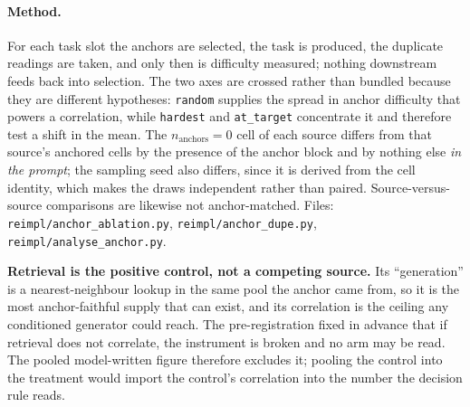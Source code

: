 \paragraph{Method.} For each task slot the anchors are selected, the task is produced, the
duplicate readings are taken, and only then is difficulty measured; nothing downstream feeds
back into selection. The two axes are crossed rather than bundled because they are different
hypotheses: \texttt{random} supplies the spread in anchor difficulty that powers a correlation,
while \texttt{hardest} and \texttt{at\_target} concentrate it and therefore test a shift in the
mean. The $n_{\text{anchors}}=0$ cell of each source differs from that source's anchored cells
by the presence of the anchor block and by nothing else \emph{in the prompt}; the sampling seed
also differs, since it is derived from the cell identity, which makes the draws independent
rather than paired. Source-versus-source comparisons are likewise not anchor-matched. Files:
\texttt{reimpl/anchor\_ablation.py}, \texttt{reimpl/anchor\_dupe.py},
\texttt{reimpl/analyse\_anchor.py}.

\textbf{Retrieval is the positive control, not a competing source.} Its ``generation'' is a
nearest-neighbour lookup in the same pool the anchor came from, so it is the most
anchor-faithful supply that can exist, and its correlation is the ceiling any conditioned
generator could reach. The pre-registration fixed in advance that if retrieval does not
correlate, the instrument is broken and no arm may be read. The pooled model-written figure
therefore excludes it; pooling the control into the treatment would import the control's
correlation into the number the decision rule reads.

